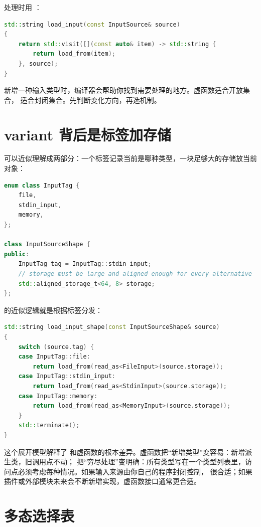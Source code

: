 处理时用 ：

\begin{lstlisting}[language=C++,caption={访问 variant}]
std::string load_input(const InputSource& source)
{
    return std::visit([](const auto& item) -> std::string {
        return load_from(item);
    }, source);
}
\end{lstlisting}

新增一种输入类型时，编译器会帮助你找到需要处理的地方。虚函数适合开放集合， 适合封闭集合。先判断变化方向，再选机制。

\section{variant 背后是标签加存储}

 可以近似理解成两部分：一个标签记录当前是哪种类型，一块足够大的存储放当前对象：

\begin{lstlisting}[language=C++,caption={variant 的近似状态}]
enum class InputTag {
    file,
    stdin_input,
    memory,
};

class InputSourceShape {
public:
    InputTag tag = InputTag::stdin_input;
    // storage must be large and aligned enough for every alternative
    std::aligned_storage_t<64, 8> storage;
};
\end{lstlisting}

 的近似逻辑就是根据标签分发：

\begin{lstlisting}[language=C++,caption={visit 的近似分发}]
std::string load_input_shape(const InputSourceShape& source)
{
    switch (source.tag) {
    case InputTag::file:
        return load_from(read_as<FileInput>(source.storage));
    case InputTag::stdin_input:
        return load_from(read_as<StdinInput>(source.storage));
    case InputTag::memory:
        return load_from(read_as<MemoryInput>(source.storage));
    }
    std::terminate();
}
\end{lstlisting}

这个展开模型解释了  和虚函数的根本差异。虚函数把“新增类型”变容易：新增派生类，旧调用点不动； 把“穷尽处理”变明确：所有类型写在一个类型列表里，访问点必须考虑每种情况。如果输入来源由你自己的程序封闭控制， 很合适；如果插件或外部模块未来会不断新增实现，虚函数接口通常更合适。

\section{多态选择表}

